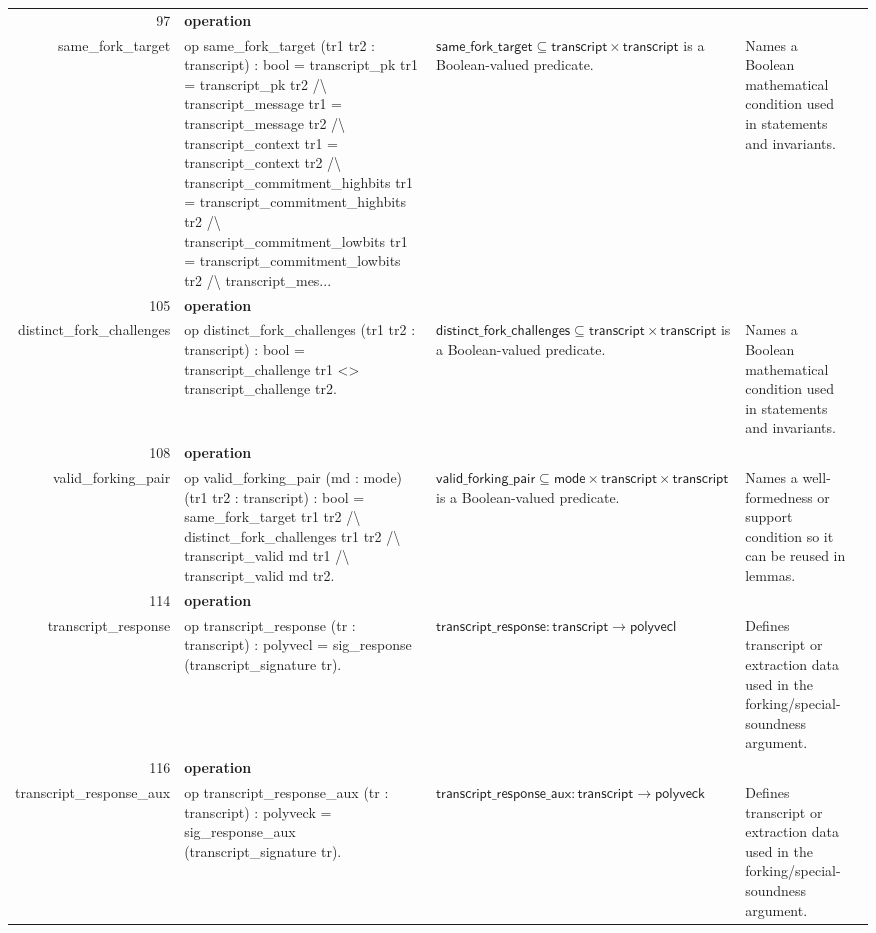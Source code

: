 \documentclass[10pt]{article}
\newcommand{\ec}[1]{\begingroup\ttfamily\scriptsize #1\endgroup}
\begin{document}
\begin{longtable}{r L{0.17\textwidth} L{0.26\textwidth} L{0.27\textwidth} L{0.20\textwidth}}
97 & \textbf{operation}\\\ec{same\_fork\_target} & \ec{op same\_fork\_target (tr1 tr2 : transcript) : bool = transcript\_pk tr1 = transcript\_pk tr2 /\textbackslash{} transcript\_message tr1 = transcript\_message tr2 /\textbackslash{} transcript\_context tr1 = transcript\_context tr2 /\textbackslash{} transcript\_commitment\_highbits tr1 = transcript\_commitment\_highbits tr2 /\textbackslash{} transcript\_commitment\_lowbits tr1 = transcript\_commitment\_lowbits tr2 /\textbackslash{} transcript\_mes...} & \(\mathsf{same\_fork\_target} \subseteq \mathsf{transcript} \times \mathsf{transcript}\) is a Boolean-valued predicate. & Names a Boolean mathematical condition used in statements and invariants. \\
105 & \textbf{operation}\\\ec{distinct\_fork\_challenges} & \ec{op distinct\_fork\_challenges (tr1 tr2 : transcript) : bool = transcript\_challenge tr1 <> transcript\_challenge tr2.} & \(\mathsf{distinct\_fork\_challenges} \subseteq \mathsf{transcript} \times \mathsf{transcript}\) is a Boolean-valued predicate. & Names a Boolean mathematical condition used in statements and invariants. \\
108 & \textbf{operation}\\\ec{valid\_forking\_pair} & \ec{op valid\_forking\_pair (md : mode) (tr1 tr2 : transcript) : bool = same\_fork\_target tr1 tr2 /\textbackslash{} distinct\_fork\_challenges tr1 tr2 /\textbackslash{} transcript\_valid md tr1 /\textbackslash{} transcript\_valid md tr2.} & \(\mathsf{valid\_forking\_pair} \subseteq \mathsf{mode} \times \mathsf{transcript} \times \mathsf{transcript}\) is a Boolean-valued predicate. & Names a well-formedness or support condition so it can be reused in lemmas. \\
114 & \textbf{operation}\\\ec{transcript\_response} & \ec{op transcript\_response (tr : transcript) : polyvecl = sig\_response (transcript\_signature tr).} & \(\mathsf{transcript\_response} : \mathsf{transcript} \to \mathsf{polyvecl}\) & Defines transcript or extraction data used in the forking/special-soundness argument. \\
116 & \textbf{operation}\\\ec{transcript\_response\_aux} & \ec{op transcript\_response\_aux (tr : transcript) : polyveck = sig\_response\_aux (transcript\_signature tr).} & \(\mathsf{transcript\_response\_aux} : \mathsf{transcript} \to \mathsf{polyveck}\) & Defines transcript or extraction data used in the forking/special-soundness argument. \\

\end{longtable}
\end{document}
